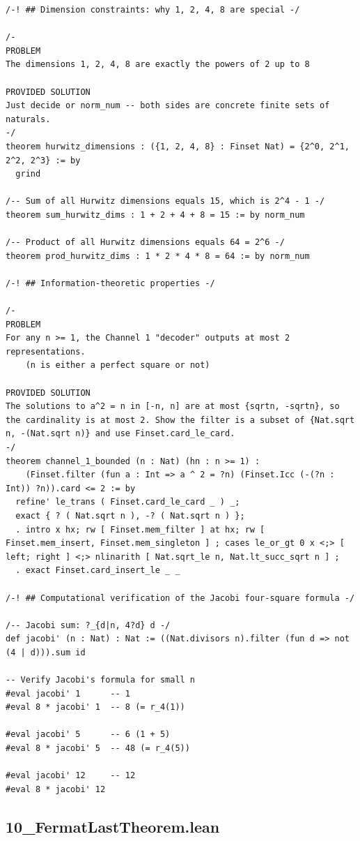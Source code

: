 \documentclass[11pt,openright,twoside]{book}
\theoremstyle{definition}
\begin{document}
\begin{lstlisting}[style=lean]
/-! ## Dimension constraints: why 1, 2, 4, 8 are special -/

/-
PROBLEM
The dimensions 1, 2, 4, 8 are exactly the powers of 2 up to 8

PROVIDED SOLUTION
Just decide or norm_num -- both sides are concrete finite sets of naturals.
-/
theorem hurwitz_dimensions : ({1, 2, 4, 8} : Finset Nat) = {2^0, 2^1, 2^2, 2^3} := by
  grind

/-- Sum of all Hurwitz dimensions equals 15, which is 2^4 - 1 -/
theorem sum_hurwitz_dims : 1 + 2 + 4 + 8 = 15 := by norm_num

/-- Product of all Hurwitz dimensions equals 64 = 2^6 -/
theorem prod_hurwitz_dims : 1 * 2 * 4 * 8 = 64 := by norm_num

/-! ## Information-theoretic properties -/

/-
PROBLEM
For any n >= 1, the Channel 1 "decoder" outputs at most 2 representations.
    (n is either a perfect square or not)

PROVIDED SOLUTION
The solutions to a^2 = n in [-n, n] are at most {sqrtn, -sqrtn}, so the cardinality is at most 2. Show the filter is a subset of {Nat.sqrt n, -(Nat.sqrt n)} and use Finset.card_le_card.
-/
theorem channel_1_bounded (n : Nat) (hn : n >= 1) :
    (Finset.filter (fun a : Int => a ^ 2 = ?n) (Finset.Icc (-(?n : Int)) ?n)).card <= 2 := by
  refine' le_trans ( Finset.card_le_card _ ) _;
  exact { ? ( Nat.sqrt n ), -? ( Nat.sqrt n ) };
  . intro x hx; rw [ Finset.mem_filter ] at hx; rw [ Finset.mem_insert, Finset.mem_singleton ] ; cases le_or_gt 0 x <;> [ left; right ] <;> nlinarith [ Nat.sqrt_le n, Nat.lt_succ_sqrt n ] ;
  . exact Finset.card_insert_le _ _

/-! ## Computational verification of the Jacobi four-square formula -/

/-- Jacobi sum: ?_{d|n, 4?d} d -/
def jacobi' (n : Nat) : Nat := ((Nat.divisors n).filter (fun d => not (4 | d))).sum id

-- Verify Jacobi's formula for small n
#eval jacobi' 1      -- 1
#eval 8 * jacobi' 1  -- 8 (= r_4(1))

#eval jacobi' 5      -- 6 (1 + 5)
#eval 8 * jacobi' 5  -- 48 (= r_4(5))

#eval jacobi' 12     -- 12
#eval 8 * jacobi' 12
\end{lstlisting}

\clearpage


\subsection*{10\_FermatLastTheorem.lean}
\label{lean:10_FermatLastTheorem}
\end{document}
